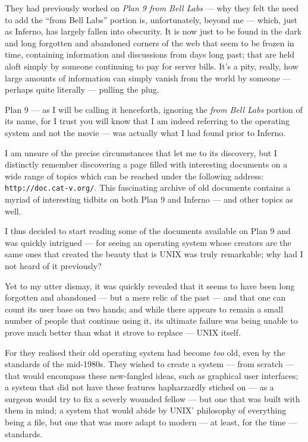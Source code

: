 \documentclass[a5paper,twoside,12pt]{report}
\begin{document}
They had previously worked on \textit{Plan 9 from Bell Labs} — why they felt the need to add the ``from Bell Labs'' portion is, unfortunately, beyond me — which, just as Inferno, has largely fallen into obscurity. It is now just to be found in the dark and long forgotten and abandoned corners of the web that seem to be frozen in time, containing information and discussions from days long past; that are held aloft simply by someone continuing to pay for server bills. It's a pity, really, how large amounts of information can simply vanish from the world by someone — perhaps quite literally — pulling the plug.

Plan 9 — as I will be calling it henceforth, ignoring the \textit{from Bell Labs} portion of its name, for I trust you will know that I am indeed referring to the operating system and not the movie — was actually what I had found prior to Inferno.

I am unsure of the precise circumstances that let me to its discovery, but I distinctly remember discovering a page filled with interesting documents on a wide range of topics which can be reached under the following address: \texttt{http://doc.cat-v.org/}. 
This fascinating archive of old documents contains a myriad of interesting tidbits on both Plan 9 and Inferno — and other topics as well. 

I thus decided to start reading some of the documents available on Plan 9 and was quickly intrigued — for seeing an operating system whose creators are the same ones that created the beauty that is UNIX was truly remarkable; why had I not heard of it previously?

Yet to my utter dismay, it was quickly revealed that it seems to have been long forgotten and abandoned — but a mere relic of the past — and that one can count its user base on two hands; and while there appears to remain a small number of people that continue using it, its ultimate failure was being unable to prove much better than what it strove to replace — UNIX itself.

For they realised their old operating system had become \textit{too} old, even by the standards of the mid-1980s. They wished to create a system — from scratch — that would encompass these new-fangled ideas, such as graphical user interfaces; a system that did not have these features hapharzardly stiched on — as a surgeon would try to fix a severly wounded fellow — but one that was built with them in mind; a system that would abide by UNIX' philosophy of everything being a file, but one that was more adapt to modern — at least, for the time — standards.
\end{document}
